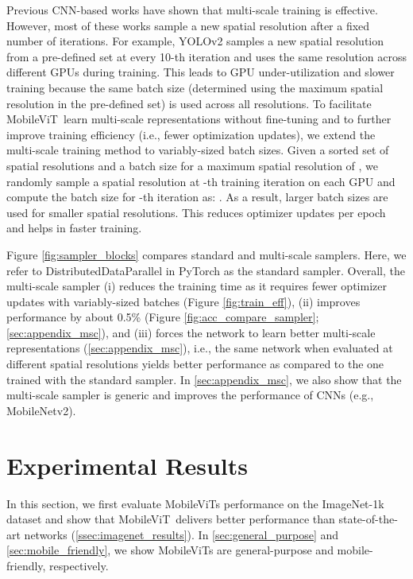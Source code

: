 \documentclass[preprint]{article} \usepackage{iclr2022_conference,times}
\newcommand{\arch}{MobileViT}
\begin{document}
Previous CNN-based works \citep[e.g.,][]{redmon2017yolo9000, mehta2021evrnet} have shown that multi-scale training is effective. However, most of these works sample a new spatial resolution after a fixed number of iterations. For example, YOLOv2 \citep{redmon2017yolo9000} samples a new spatial resolution from a pre-defined set at every 10-th iteration and uses the same resolution across different GPUs during training. This leads to GPU under-utilization and slower training because the same batch size (determined using the maximum spatial resolution in the pre-defined set) is used across all resolutions. 
To facilitate \arch~learn multi-scale representations without fine-tuning and to further improve training efficiency (i.e., fewer optimization updates), we extend the multi-scale training method to variably-sized batch sizes. Given a sorted set of spatial resolutions  and a batch size  for a maximum spatial resolution of , we randomly sample a spatial resolution  at -th training iteration on each GPU and  compute the batch size for -th iteration as: . As a result, larger batch sizes are used for smaller spatial resolutions. This reduces optimizer updates per epoch and helps in faster training. 

Figure \ref{fig:sampler_blocks} compares standard and multi-scale samplers. Here, we refer to DistributedDataParallel in PyTorch as the standard sampler. Overall, the multi-scale sampler (i) reduces the training time as it requires fewer optimizer updates with variably-sized batches (Figure \ref{fig:train_eff}), (ii) improves performance by about 0.5\% (Figure \ref{fig:acc_compare_sampler}; \textsection \ref{sec:appendix_msc}), and (iii) forces the network to learn better multi-scale representations (\textsection \ref{sec:appendix_msc}), i.e., the same network when evaluated at different spatial resolutions yields better performance as compared to the one trained with the standard sampler. In \textsection \ref{sec:appendix_msc}, we also show that the multi-scale sampler is generic and improves the performance of CNNs (e.g., MobileNetv2).

\section{Experimental Results}
In this section, we first evaluate \arch s performance on the ImageNet-1k dataset and show that \arch~delivers better performance than state-of-the-art networks (\textsection \ref{ssec:imagenet_results}). In \textsection \ref{sec:general_purpose} and \textsection \ref{sec:mobile_friendly}, we show \arch s are general-purpose and mobile-friendly, respectively.
\end{document}
